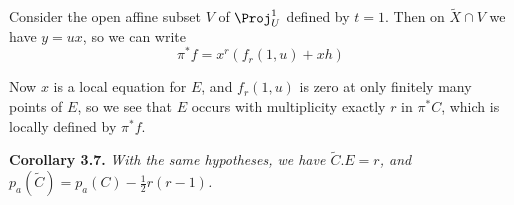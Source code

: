 {Consider the open affine subset $V$ of $\Proj_U^1$ defined by $t=1$. Then on $\widetilde X\cap V$ we have $y=ux$, so we can write
\[
\pi^*f=x^r(f_r(1,u)+xh)
\]
\noindent {}

Now $x$ is a local equation for $E$, and $f_r(1,u)$ is zero at only finitely many points of $E$, so we see that $E$ occurs with multiplicity exactly $r$ in $\pi^*C$, which is locally defined by $\pi^*f$.

\medskip
\noindent\hypertarget{result-V-3.7}{}\textbf{Corollary 3.7.} \emph{With the same hypotheses, we have $\widetilde C.E=r$, and $p_a(\widetilde C)=p_a(C)-\frac12r(r-1)$.}
}
